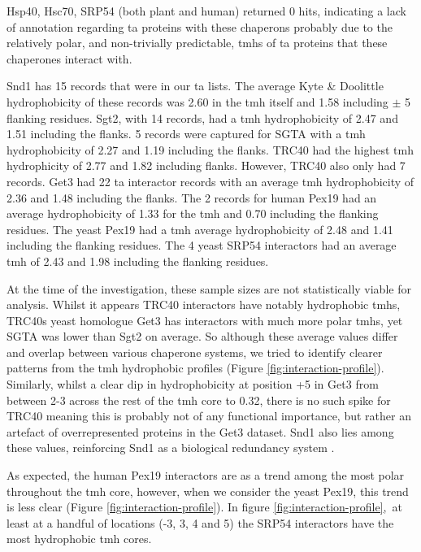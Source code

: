 Hsp40, Hsc70, SRP54 (both plant and human) returned 0 hits, indicating a lack of annotation regarding \gls{ta} proteins with these chaperons probably due to the relatively polar, and non-trivially predictable, \gls{tmh}s of \gls{ta} proteins that these chaperones interact with.

Snd1 has 15 records that were in our \gls{ta} lists.
The average Kyte \& Doolittle hydrophobicity of these records was 2.60 in the \gls{tmh} itself and 1.58 including $\pm$ 5 flanking residues.
Sgt2, with 14 records, had a \gls{tmh} hydrophobicity of 2.47 and 1.51 including the flanks.
5 records were captured for SGTA with a \gls{tmh} hydrophobicity of 2.27 and 1.19 including the flanks.
TRC40 had the highest \gls{tmh} hydrophicity of 2.77 and 1.82 including flanks.
However, TRC40 also only had 7 records.
Get3 had 22 \gls{ta} interactor records with an average \gls{tmh} hydrophobicity of 2.36 and 1.48 including the flanks.
The 2 records for human Pex19 had an average hydrophobicity of 1.33 for the \gls{tmh} and 0.70 including the flanking residues.
The yeast Pex19 had a \gls{tmh} average hydrophobicity of 2.48 and 1.41 including the flanking residues.
The 4 yeast SRP54 interactors had an average \gls{tmh} of 2.43 and 1.98 including the flanking residues.

At the time of the investigation, these sample sizes are not statistically viable for analysis.
Whilst it appears TRC40 interactors have notably hydrophobic \gls{tmh}s, TRC40s yeast homologue Get3 has interactors with much more polar \gls{tmh}s, yet SGTA was lower than Sgt2 on average.
So although these average values differ and overlap between various chaperone systems, we tried to identify clearer patterns from the \gls{tmh} hydrophobic profiles (Figure \ref{fig:interaction-profile}).
Similarly, whilst a clear dip in hydrophobicity at position +5 in Get3 from between 2-3 across the rest of the \gls{tmh} core to 0.32, there is no such spike for TRC40 meaning this is probably not of any functional importance, but rather an artefact of overrepresented proteins in the Get3 dataset.
Snd1 also lies among these values, reinforcing Snd1 as a biological redundancy system \cite{Rabu2009, Johnson2013, Schuldiner2008}.

As expected, the human Pex19 interactors are as a trend among the most polar throughout the \gls{tmh} core, however, when we consider the yeast Pex19, this trend is less clear (Figure \ref{fig:interaction-profile}). In figure \ref{fig:interaction-profile},~at least at a handful of locations (-3, 3, 4 and 5) the SRP54 interactors have the most hydrophobic \gls{tmh} cores.


